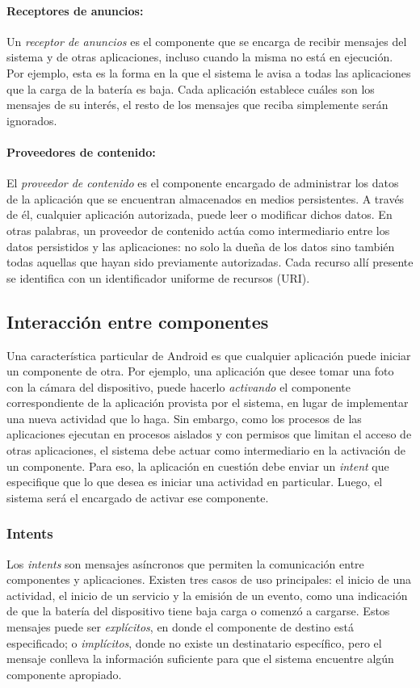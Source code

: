 \paragraph{Receptores de anuncios: }
Un \textit{receptor de anuncios} es el componente que se encarga de recibir mensajes del sistema y
de otras aplicaciones, incluso cuando la misma no está en ejecución. Por ejemplo, esta es la forma
en la que el sistema le avisa a todas las aplicaciones que la carga de la batería es baja. Cada
aplicación establece cuáles son los mensajes de su interés, el resto de los mensajes que reciba
simplemente serán ignorados.

\paragraph{Proveedores de contenido:}
El \textit{proveedor de contenido} es el componente encargado de administrar los datos de la
aplicación que se encuentran almacenados en medios persistentes. A través de él, cualquier
aplicación autorizada, puede leer o modificar dichos datos. En otras palabras, un proveedor de
contenido actúa como intermediario entre los datos persistidos y las aplicaciones: no solo la dueña
de los datos sino también todas aquellas que hayan sido previamente autorizadas. Cada recurso allí
presente se identifica con un identificador uniforme de recursos (URI).

\subsection{Interacción entre componentes}
Una característica particular de Android es que cualquier aplicación puede iniciar un componente de
otra. Por ejemplo, una aplicación que desee tomar una foto con la cámara del dispositivo, puede
hacerlo \textit{activando} el componente correspondiente de la aplicación provista por el sistema,
en lugar de implementar una nueva actividad que lo haga. Sin embargo, como los procesos de las
aplicaciones ejecutan en procesos aislados y con permisos que limitan el acceso de otras
aplicaciones, el sistema debe actuar como intermediario en la activación de un componente. Para eso,
la aplicación en cuestión debe enviar un \textit{intent} que especifique que lo que desea es iniciar
una actividad en particular. Luego, el sistema será el encargado de activar ese componente.

\subsubsection*{Intents}
Los \textit{intents} son mensajes asíncronos que permiten la comunicación entre componentes y
aplicaciones. Existen tres casos de uso principales: el inicio de una actividad, el inicio de un
servicio y la emisión de un evento, como una indicación de que la batería del dispositivo tiene baja
carga o comenzó a cargarse. Estos mensajes puede ser \textit{explícitos}, en donde el componente de
destino está especificado; o \textit{implícitos}, donde no existe un destinatario específico, pero
el mensaje conlleva la información suficiente para que el sistema encuentre algún componente
apropiado.

